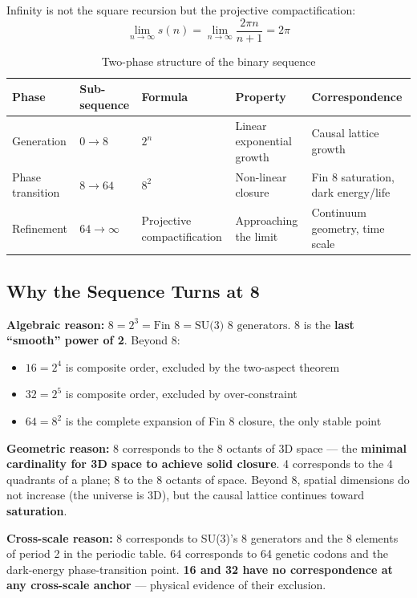 \documentclass[aps,prd,twocolumn,nofootinbib,floatfix]{revtex4-2}
\begin{document}
Infinity is not the square recursion but the projective compactification:
\[
\lim_{n\to\infty} s(n) = \lim_{n\to\infty} \frac{2\pi n}{n+1} = 2\pi
\]

\begin{table}[h]
\centering
\begin{tabular}{|l|l|l|l|l|}
\hline
Phase & Sub-sequence & Formula & Property & Correspondence \\
\hline
Generation & $0 \to 8$ & $2^n$ & Linear exponential growth & Causal lattice growth \\
Phase transition & $8 \to 64$ & $8^2$ & Non-linear closure & Fin 8 saturation, dark energy/life \\
Refinement & $64 \to \infty$ & Projective compactification & Approaching the limit & Continuum geometry, time scale \\
\hline
\end{tabular}
\caption{Two-phase structure of the binary sequence}
\end{table}

\subsection{Why the Sequence Turns at 8}

\textbf{Algebraic reason:} $8 = 2^3 = \text{Fin 8} = \text{SU(3) 8 generators}$. 8 is the \textbf{last ``smooth'' power of 2}. Beyond 8:
\begin{itemize}
    \item $16 = 2^4$ is composite order, excluded by the two-aspect theorem
    \item $32 = 2^5$ is composite order, excluded by over-constraint
    \item $64 = 8^2$ is the complete expansion of Fin 8 closure, the only stable point
\end{itemize}

\textbf{Geometric reason:} 8 corresponds to the 8 octants of 3D space --- the \textbf{minimal cardinality for 3D space to achieve solid closure}. 4 corresponds to the 4 quadrants of a plane; 8 to the 8 octants of space. Beyond 8, spatial dimensions do not increase (the universe is 3D), but the causal lattice continues toward \textbf{saturation}.

\textbf{Cross-scale reason:} 8 corresponds to SU(3)'s 8 generators and the 8 elements of period 2 in the periodic table. 64 corresponds to 64 genetic codons and the dark-energy phase-transition point. \textbf{16 and 32 have no correspondence at any cross-scale anchor} --- physical evidence of their exclusion.
\end{document}
